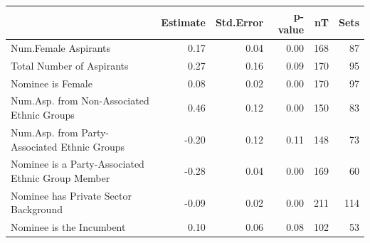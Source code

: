 \begin{table}[ht]
\centering
\label{tab:results.10}
\begin{tabular}{lrrrrr}
  \hline
 & Estimate & Std.Error & p-value & nT & Sets \\ 
  \hline
Num.Female Aspirants & 0.17 & 0.04 & 0.00 & 168 & 87 \\ 
  Total Number of Aspirants & 0.27 & 0.16 & 0.09 & 170 & 95 \\ 
  Nominee is Female & 0.08 & 0.02 & 0.00 & 170 & 97 \\ 
  Num.Asp. from Non-Associated Ethnic Groups & 0.46 & 0.12 & 0.00 & 150 & 83 \\ 
  Num.Asp. from Party-Associated Ethnic Groups & -0.20 & 0.12 & 0.11 & 148 & 73 \\ 
  Nominee is a Party-Associated Ethnic Group Member & -0.28 & 0.04 & 0.00 & 169 & 60 \\ 
  Nominee has Private Sector Background & -0.09 & 0.02 & 0.00 & 211 & 114 \\ 
  Nominee is the Incumbent & 0.10 & 0.06 & 0.08 & 102 & 53 \\ 
   \hline
\end{tabular}
\end{table}
